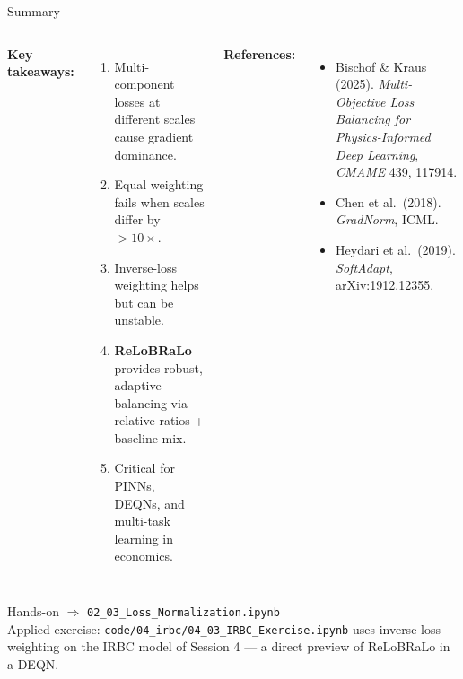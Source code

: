 \documentclass[aspectratio=169,11pt]{beamer}
\newcommand{\emphc}[1]{\textcolor{harvardcrimson}{#1}}
\begin{document}
\begin{frame}[shrink=8]{Summary}
\small
\begin{columns}[T]
\textbf{Key takeaways:}
\begin{enumerate}\itemsep1pt
    \item Multi-component losses at different scales cause \emphc{gradient dominance}.
    \item Equal weighting fails when scales differ by $>10\times$.
    \item Inverse-loss weighting helps but can be unstable.
    \item \textbf{ReLoBRaLo} provides robust, adaptive balancing via relative ratios + baseline mix.
    \item Critical for PINNs, DEQNs, and multi-task learning in economics.
\end{enumerate}

\textbf{References:}
{\scriptsize
\begin{itemize}\itemsep0pt
    \item Bischof \& Kraus (2025). \emph{Multi-Objective Loss Balancing for Physics-Informed Deep Learning}, \emph{CMAME} 439, 117914.
    \item Chen et al.\ (2018). \emph{GradNorm}, ICML.
    \item Heydari et al.\ (2019). \emph{SoftAdapt}, arXiv:1912.12355.
\end{itemize}
}
\end{columns}

\vspace{0.3cm}
\begin{block}{Hands-on}
$\Rightarrow$ \texttt{02\_03\_Loss\_Normalization.ipynb}\\[2pt]
{\footnotesize Applied exercise: \texttt{code/04\_irbc/04\_03\_IRBC\_Exercise.ipynb} uses inverse-loss weighting on the IRBC model of Session 4 --- a direct preview of ReLoBRaLo in a DEQN.}
\end{block}
\end{frame}
\end{document}
